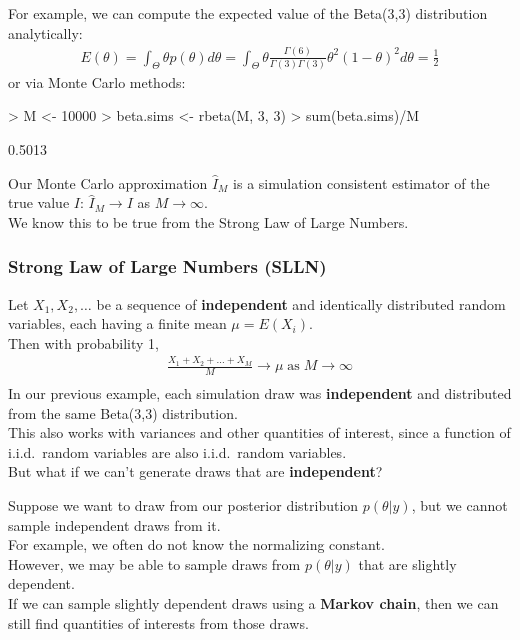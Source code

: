 \documentclass{beamer}
\begin{document}
\begin{frame}[fragile]
For example, we can compute the expected value of the Beta(3,3)
distribution analytically:
\pause
\begin{eqnarray*}
E(\theta) = \int_{\Theta} \theta p(\theta) d\theta =
\int_{\Theta} \theta \frac{\Gamma(6)}{\Gamma(3) \Gamma(3)} \theta^{2}
(1-\theta)^2 d\theta = \frac{1}{2}
\end{eqnarray*}
\pause
or via Monte Carlo methods:
\pause
\medskip
\tiny
\begin{Schunk}
\begin{Sinput}
> M <- 10000
> beta.sims <- rbeta(M, 3, 3)
> sum(beta.sims)/M
\end{Sinput}
\begin{Soutput}
[1] 0.5013
\end{Soutput}
\end{Schunk}
\pause
\normalsize
Our Monte Carlo approximation $\hat{I}_M$ is a simulation consistent
estimator of the true value $I$: \pause $\hat{I}_M
\rightarrow I$ as $M \rightarrow \infty$.\\
\bigskip
\pause
We know this to be true from the Strong Law of Large Numbers.
\end{frame}

\begin{frame}
\frametitle{Strong Law of Large Numbers (SLLN)}
\pause
Let $X_1, X_2, \dots$ be a sequence of \textbf{independent} and
identically distributed random variables, each having a finite mean
$\mu = E(X_i)$.\\
\bigskip
Then with probability 1,
\begin{eqnarray*}
\frac{X_1 + X_2 + \dots + X_M}{M} \rightarrow \mu \; \mathrm{as} \; M
\rightarrow \infty\\
\end{eqnarray*}
\pause
In our previous example, each simulation draw was \textbf{independent} and
distributed from the same Beta(3,3) distribution.\\
\bigskip
\pause
This also works with variances and other quantities of interest, since a
function of i.i.d.\ random variables are also i.i.d.\ random variables.\\
\bigskip
\pause
But what if we can't generate draws that are \textbf{independent}?

\end{frame}

\begin{frame}
Suppose we want to draw from our posterior distribution $p(\theta |
y)$, but we cannot sample independent draws from it.\\
\bigskip
\pause
For example, we often do not know the normalizing constant.\\
\bigskip
\pause
However, we may be able to sample draws from $p(\theta | y)$ that are
slightly dependent.\\
\bigskip
\pause
If we can sample slightly dependent draws using a \textbf{Markov
chain}, then we can still find quantities of interests from those draws.
\end{frame}
\end{document}
